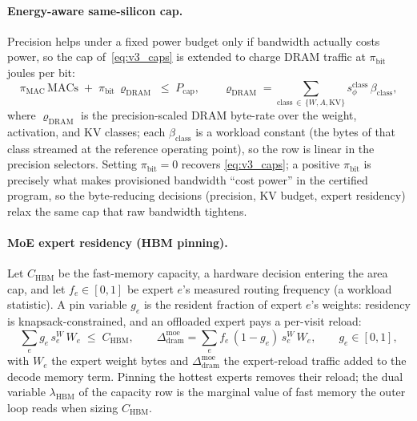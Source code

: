 \paragraph{Energy-aware same-silicon cap.}
Precision helps under a fixed power budget only if bandwidth actually costs
power, so the cap of~\eqref{eq:v3_caps} is extended to charge DRAM traffic at
$\pi_{\mathrm{bit}}$ joules per bit:
\begin{equation}
\pi_{\mathrm{MAC}}\,\mathrm{MACs} \;+\; \pi_{\mathrm{bit}}\, \varrho_{\mathrm{DRAM}}
\;\le\; P_{\mathrm{cap}},
\qquad
\varrho_{\mathrm{DRAM}} = \sum_{\text{class}\,\in\,\{W,A,\mathrm{KV}\}}
   s^{\text{class}}_{\phi}\,\beta_{\text{class}} ,
\label{eq:v3_power}
\end{equation}
where $\varrho_{\mathrm{DRAM}}$ is the precision-scaled DRAM byte-rate over the
weight, activation, and KV classes; each $\beta_{\text{class}}$ is a workload
constant (the bytes of that class streamed at the reference operating point),
so the row is linear in the precision selectors. Setting $\pi_{\mathrm{bit}}=0$ recovers
\eqref{eq:v3_caps}; a positive $\pi_{\mathrm{bit}}$ is precisely what makes
provisioned bandwidth ``cost power'' in the certified program, so the
byte-reducing decisions (precision, KV budget, expert residency) relax the same cap
that raw bandwidth tightens.

\paragraph{MoE expert residency (HBM pinning).}
Let $C_{\mathrm{HBM}}$ be the fast-memory capacity, a hardware decision entering
the area cap, and let $f_e\in[0,1]$ be expert $e$'s measured routing frequency (a
workload statistic). A pin variable $g_e$ is the resident fraction of expert
$e$'s weights: residency is knapsack-constrained, and an offloaded expert pays a
per-visit reload:
\begin{equation}
\sum_{e} g_e\, s^{W}_e\, W_e \;\le\; C_{\mathrm{HBM}},
\qquad
\Delta^{\mathrm{moe}}_{\mathrm{dram}} = \sum_{e} f_e\,(1-g_e)\, s^{W}_e\, W_e,
\qquad g_e \in [0,1],
\label{eq:v3_expres}
\end{equation}
with $W_e$ the expert weight bytes and $\Delta^{\mathrm{moe}}_{\mathrm{dram}}$ the
expert-reload traffic added to the decode memory term. Pinning the hottest
experts removes their reload; the dual variable $\lambda_{\mathrm{HBM}}$ of the
capacity row is the marginal value of fast memory the outer loop reads when
sizing $C_{\mathrm{HBM}}$.

